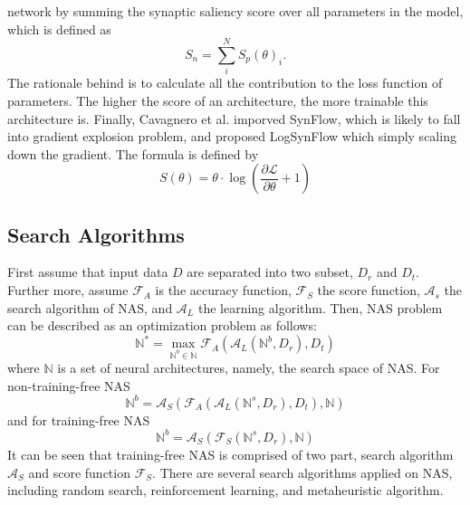 \documentclass[sigconf]{acmart}
\begin{document}
    network by summing the synaptic saliency score over all parameters in the model, which is 
    defined as 
    \begin{equation}
        \label{equ:zero_cost}
        S_n=\sum^N_i S_p(\theta)_i.
    \end{equation}
    The rationale behind is to calculate all the contribution to the loss function of parameters. 
    The higher the score of an architecture, the more trainable this architecture is. 
    Finally, Cavagnero et al. \cite{Cavagnero_2023} imporved SynFlow, which is likely to fall into 
    gradient explosion problem, and proposed LogSynFlow which simply scaling down the gradient. 
    The formula is defined by 
    \begin{equation}
        \label{equ:logsynflow}
        S(\theta)=\theta\cdot\log(\frac{\partial \mathcal L}{\partial \theta}+1)
    \end{equation}

    \subsection{Search Algorithms}
    First assume that input data $D$ are separated into two subset, $D_r$ and $D_t$. Further more, 
    assume $\mathcal F_A$ is the accuracy function, $\mathcal F_S$ the score function, $\mathcal A_s$ the 
    search algorithm of NAS, and $\mathcal A_L$ the learning algorithm. Then, NAS problem can be 
    described as an optimization problem as follows: 
    \begin{equation}
        \label{equ:nas}
        \mathbb N^*=\max_{\mathbb N^b\in\mathbb N}\mathcal F_A(\mathcal A_L(\mathbb N^b, D_r), D_t)
    \end{equation}
    where $\mathbb N$ is a set of neural architectures, namely, the search space of NAS. 
    For non-training-free NAS 
    \begin{equation}
        \label{equ:non-training_free_nas}
        \mathbb N^b=\mathcal A_S(\mathcal F_A(\mathcal A_L(\mathbb N^s, D_r), D_t), \mathbb N)
    \end{equation}
    and for training-free NAS 
    \begin{equation}
        \label{equ:training_free_nas}
        \mathbb N^b=\mathcal A_S(\mathcal F_S(\mathbb N^s, D_r), \mathbb N)
    \end{equation}
    It can be seen that training-free NAS is comprised of two part, search algorithm $\mathcal A_S$ and score 
    function $\mathcal F_S$. 
    There are several search algorithms applied on NAS, including random search, reinforcement learning, and
    metaheuristic algorithm. 
    
\end{document}
